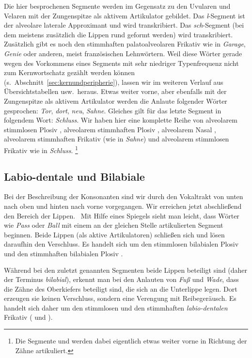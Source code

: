 Die hier besprochenen Segmente werden im Gegensatz zu den Uvularen und Velaren mit der Zungenspitze als aktivem Artikulator gebildet.
Das \textit{l}-Segment ist der alveolare laterale Approximant und wird \textipa{[l]} transkribiert.
Das \textit{sch}-Segment (bei dem meistens zusätzlich die Lippen rund geformt werden) wird \textipa{[S]} transkribiert.
Zusätzlich gibt es noch den stimmhaften palatoalveolaren Frikativ \textipa{[Z]} wie in \textit{Garage}, \textit{Genie} oder anderen, meist französischen Lehnwörtern.
Weil diese Wörter gerade wegen des Vorkommens eines Segments mit sehr niedriger Typenfrequenz nicht zum Kernwortschatz gezählt werden können (s.\ Abschnitt~\ref{sec:kernundperipherie}), lassen wir \textipa{[Z]} im weiteren Verlauf aus Übersichtstabellen usw.\ heraus.
Etwas weiter vorne, aber ebenfalls mit der Zungenspitze als aktivem Artikulator werden die Anlaute folgender Wörter gesprochen: \textit{Tor}, \textit{dort}, \textit{neu}, \textit{Sahne}.
Gleiches gilt für das letzte Segment in folgendem Wort: \textit{Schluss}.
Wir haben hier eine komplette Reihe von alveolarem stimmlosen Plosiv \textipa{[t]}, alveolarem stimmhaften Plosiv \textipa{[d]}, alveolarem Nasal \textipa{[n]}, alveolarem stimmhaften Frikativ \textipa{[z]} (wie in \textit{Sahne}) und alveolarem stimmlosen Frikativ \textipa{[s]} wie in \textit{Schluss}.%
\footnote{Die Segmente \textipa{[s]} und \textipa{[z]} werden dabei eigentlich etwas weiter vorne in Richtung der Zähne artikuliert.}

\subsection{Labio-dentale und Bilabiale}


Bei der Beschreibung der Konsonanten sind wir durch den Vokaltrakt von unten nach oben und hinten nach vorne vorgegangen.
Wir erreichen jetzt abschließend den Bereich der Lippen.
\TuBegin~Mit Hilfe eines Spiegels sieht man leicht, dass Wörter wie \textit{Pass} oder \textit{Ball} mit einem an der gleichen Stelle artikulierten Segment beginnen.
Beide Lippen (als aktive Artikulatoren) schließen sich und lösen daraufhin den Verschluss.
Es handelt sich um den stimmlosen bilabialen Plosiv \textipa{[p]} und den stimmhaften bilabialen Plosiv \textipa{[b]}.

Während bei den zuletzt genannten Segmenten beide Lippen beteiligt sind (daher der Terminus \textit{bilabial}), erkennt man bei den Anlauten von \textit{Fuß} und \textit{Wade}, dass die Zähne des Oberkiefers beteiligt sind, die sich an die Unterlippe legen.
Dort erzeugen sie keinen Verschluss, sondern eine Verengung mit Reibegeräusch.
Es handelt sich daher um den stimmlosen und den stimmhaften \textit{labio-dentalen} Frikativ (\textipa{[f]} und \textipa{[v]}).

